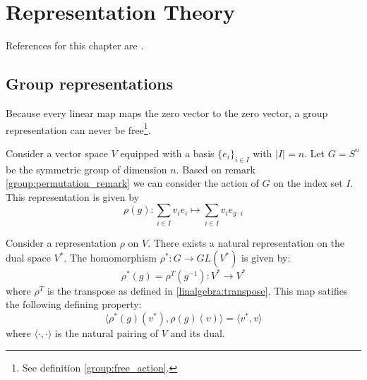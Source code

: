\chapter{Representation Theory}

References for this chapter are \cite{fultonharris, jeevanjee}.

\section{Group representations}
    	
    	\begin{property}
    		Because every linear map maps the zero vector to the zero vector, a group representation can never be free\footnote{See definition \ref{group:free_action}.}.
    	\end{property}

        
	\begin{example}
		Consider a vector space $V$ equipped with a basis $\{e_i\}_{i\in I}$ with $|I| = n$. Let $G = S^n$ be the symmetric group of dimension $n$. Based on remark \ref{group:permutation_remark} we can consider the action of $G$ on the index set $I$. This representation is given by
		\begin{equation}
			\rho(g):\sum_{i\in I}v_ie_i\mapsto\sum_{i\in I}v_ie_{g\cdot i}
		\end{equation}
	\end{example}
        
        \begin{example}
        	Consider a representation $\rho$ on $V$. There exists a natural representation on the dual space $V^*$. The homomorphism $\rho^*:G\rightarrow GL(V^*)$ is given by:
            \begin{equation}
            	\rho^*(g) = \rho^T(g^{-1}): V^*\rightarrow V^*
            \end{equation}
            where $\rho^T$ is the transpose as defined in \ref{linalgebra:transpose}. This map satifies the following defining property:
            \begin{equation}
            	\Big\langle\rho^*(g)(v^*), \rho(g)(v)\Big\rangle = \langle v^*, v\rangle
            \end{equation}
            where $\langle\cdot,\cdot\rangle$ is the natural pairing of $V$ and its dual.
        \end{example}
        
